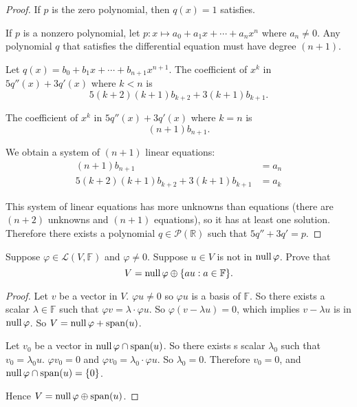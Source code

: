 \begin{proof}
    If $p$ is the zero polynomial, then $q(x) = 1$ satisfies.

    If $p$ is a nonzero polynomial, let $p: x\mapsto a_{0} + a_{1}x + \cdots + a_{n}x^{n}$ where $a_{n}\ne 0$. Any polynomial $q$ that satisfies the differential equation must have degree $(n+1)$.

    Let $q(x) = b_{0} + b_{1}x + \cdots + b_{n+1}x^{n+1}$. The coefficient of $x^{k}$ in $5q''(x) + 3q'(x)$ where $k < n$ is
    \[
        5(k+2)(k+1)b_{k+2} + 3(k+1)b_{k+1}.
    \]

    The coefficient of $x^{k}$ in $5q''(x) + 3q'(x)$ where $k = n$ is
    \[
        (n+1)b_{n+1}.
    \]

    We obtain a system of $(n+1)$ linear equations:
    \begin{align*}
        (n+1)b_{n+1}                       & = a_{n} \\
        5(k+2)(k+1)b_{k+2} + 3(k+1)b_{k+1} & = a_{k}
    \end{align*}

    This system of linear equations has more unknowns than equations (there are $(n+2)$ unknowns and $(n+1)$ equations), so it has at least one solution. Therefore there exists a polynomial $q\in\mathcal{P}(\mathbb{R})$ such that $5q'' + 3q' = p$.
\end{proof}
\newpage

\begin{exercise}\label{chapter3:sectionB:exercise30}
    Suppose $\varphi \in \mathcal{L}(V, \mathbb{F})$ and $\varphi \ne 0$. Suppose $u \in V$ is not in $\text{null}\,{\varphi}$. Prove that
    \[
        V = \text{null}\,{\varphi} \oplus \{ au : a\in\mathbb{F} \}.
    \]
\end{exercise}

\begin{proof}
    Let $v$ be a vector in $V$. $\varphi u\ne 0$ so $\varphi u$ is a basis of $\mathbb{F}$. So there exists a scalar $\lambda\in\mathbb{F}$ such that $\varphi v = \lambda\cdot \varphi u$. So $\varphi(v - \lambda u) = 0$, which implies $v - \lambda u$ is in $\text{null}\,{\varphi}$. So $V = \text{null}\,{\varphi} + \text{span}(u)$.

    Let $v_{0}$ be a vector in $\text{null}\,{\varphi}\cap\text{span}(u)$. So there exists s scalar $\lambda_{0}$ such that $v_{0} = \lambda_{0}u$. $\varphi v_{0} = 0$ and $\varphi v_{0} = \lambda_{0}\cdot \varphi u$. So $\lambda_{0} = 0$. Therefore $v_{0} = 0$, and $\text{null}\,{\varphi}\cap\text{span}(u) = \{0\}$.

    Hence $V = \text{null}\,{\varphi} \oplus \text{span}(u)$.
\end{proof}
\newpage

